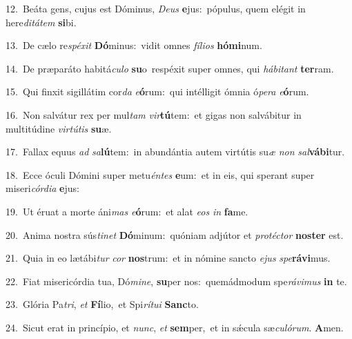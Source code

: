 {\numbfont\textcolor{\numbcolor}{12.}}~Beáta gens, cujus est Dóminus, \textit{De}\-\textit{us} \textbf{e}\-jus:~\star pópulus, quem elégit in here\-\textit{di}\-\textit{tá}\textit{tem} \textbf{si}\-bi.\par
{\numbfont\textcolor{\numbcolor}{13.}}~De cælo re\-\textit{spé}\-\textit{xit} \textbf{Dó}\-minus:~\star vidit omnes \textit{fí}\-\textit{li}\textit{os} \textbf{hó}\-\textbf{mi}num.\par
{\numbfont\textcolor{\numbcolor}{14.}}~De præparáto habitá\-\textit{cu}\-\textit{lo} \textbf{su}\-o~\star respéxit super omnes, qui \textit{há}\-\textit{bi}\textit{tant} \textbf{ter}\-ram.\par
{\numbfont\textcolor{\numbcolor}{15.}}~Qui finxit sigillátim cor\textit{da} \textit{e}\-\textbf{ó}rum:~\star qui intélligit ómnia ó\-\textit{pe}\-\textit{ra} \textit{e}\-\textbf{ó}rum.\par
{\numbfont\textcolor{\numbcolor}{16.}}~Non salvátur rex per mul\textit{tam} \textit{vir}\-\textbf{tú}tem:~\star et gigas non salvábitur in multitúdine \textit{vir}\-\textit{tú}\textit{tis} \textbf{su}\-æ.\par
{\numbfont\textcolor{\numbcolor}{17.}}~Fallax equus \textit{ad} \textit{sa}\-\textbf{lú}tem:~\star in abundántia autem virtútis su\textit{æ} \textit{non} \textit{sal}\-\textbf{vá}\textbf{bi}tur.\par
{\numbfont\textcolor{\numbcolor}{18.}}~Ecce óculi Dómini super metu\-\textit{én}\-\textit{tes} \textbf{e}\-um:~\star et in eis, qui sperant super miseri\-\textit{cór}\-\textit{di}\textit{a} \textbf{e}\-jus:\par
{\numbfont\textcolor{\numbcolor}{19.}}~Ut éruat a morte áni\textit{mas} \textit{e}\-\textbf{ó}rum:~\star et alat \textit{e}\-\textit{os} \textit{in} \textbf{fa}\-me.\par
{\numbfont\textcolor{\numbcolor}{20.}}~Anima nostra sús\-\textit{ti}\-\textit{net} \textbf{Dó}\-minum:~\star quóniam adjútor et \textit{pro}\-\textit{téc}\textit{tor} \textbf{nos}\-\textbf{ter} est.\par
{\numbfont\textcolor{\numbcolor}{21.}}~Quia in eo lætábi\textit{tur} \textit{cor} \textbf{nos}\-trum:~\star et in nómine sancto \textit{e}\-\textit{jus} \textit{spe}\-\textbf{rá}\textbf{vi}mus.\par
{\numbfont\textcolor{\numbcolor}{22.}}~Fiat misericórdia tua, Dó\-\textit{mi}\-\textit{ne}, \textbf{su}\-per nos:~\star quemádmodum spe\-\textit{rá}\-\textit{vi}\textit{mus} \textbf{in} te.\par
{\numbfont\textcolor{\numbcolor}{23.}}~Glória Pa\-\textit{tri}\-, \textit{et} \textbf{Fí}\-lio,~\star et Spi\-\textit{rí}\-\textit{tu}\textit{i} \textbf{Sanc}\-to.\par
{\numbfont\textcolor{\numbcolor}{24.}}~Sicut erat in princípio, et \textit{nunc}\-, \textit{et} \textbf{sem}\-per,~\star et in sǽcula sæ\-\textit{cu}\-\textit{ló}\textit{rum}. \textbf{A}\-men.\par
